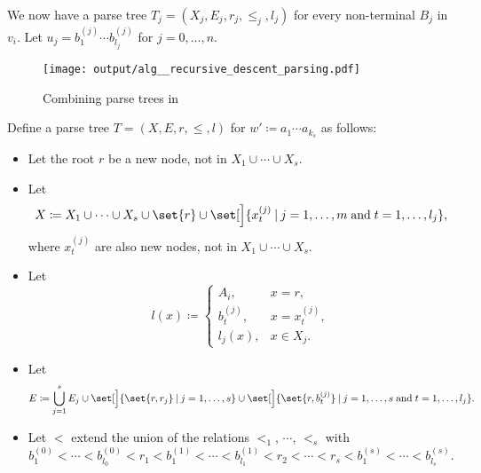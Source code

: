 \begin{algorithm}
\begin{thmenum}
     We now have a parse tree \( T_j = (X_j, E_j, r_j, \leq_j, l_j) \) for every non-terminal \( B_j \) in \( v_i \). Let \( u_j = b_1^{(j)} \cdots b_{l_j}^{(j)} \) for \( j = 0, \ldots, n \).

    \begin{figure}[!ht]
      \centering
      \texttt{[image: output/alg\_\_recursive\_descent\_parsing.pdf]}
      \caption{Combining parse trees in }
      \label{fig:alg:recursive_descent_parsing/assembly}
    \end{figure}

    Define a parse tree \( T = (X, E, r, \leq, l) \) for \( w' \coloneqq a_1 \cdots a_{k_s} \) as follows:
    \begin{itemize}
      \item Let the root \( r \) be a new node, not in \( X_1 \cup \cdots \cup X_s \).
      \item Let
      \begin{equation*}
        X \coloneqq X_1 \cup \cdots \cup X_s \cup \set{ r } \cup \set[\Big]{ x_t^{(j)} \given j = 1, \ldots, m \T{and} t = 1, \ldots, l_j },
      \end{equation*}
      where \( x_t^{(j)} \) are also new nodes, not in \( X_1 \cup \cdots \cup X_s \).

      \item Let
      \begin{equation*}
        l(x) \coloneqq \begin{cases}
          A_i,       &x = r, \\
          b_t^{(j)}, &x = x_t^{(j)}, \\
          l_j(x),    &x \in X_j.
        \end{cases}
      \end{equation*}

      \item Let
      \begin{equation*}
        E \coloneqq \bigcup_{j=1}^s E_j \cup \set[\Big]{ \set{ r, r_j } \given j = 1, \ldots, s } \cup \set[\Big]{ \set{ r, b_t^{(j)} } \given j = 1, \ldots, s \T{and} t = 1, \ldots, l_j }.
      \end{equation*}

      \item Let \( < \) extend the union of the relations \( {}<_1{} \), \( \cdots \), \( {}<_s{} \) with
      \begin{equation*}
        b_1^{(0)} < \cdots < b_{l_0}^{(0)} < r_1 < b_1^{(1)} < \cdots < b_{l_1}^{(1)} < r_2 < \cdots < r_s < b_1^{(s)} < \cdots < b_{l_s}^{(s)}.
      \end{equation*}
    \end{itemize}


\end{thmenum}
\end{algorithm}
